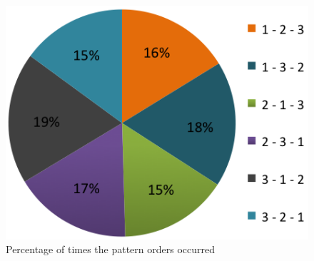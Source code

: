 		\begin{figure}[H]
      \centering
      \includegraphics[scale=0.5]{pics/analysis/patternOrder.png}
      \caption{Percentage of times the pattern orders occurred}
      \label{fig:patternOrder}
    \end{figure}
